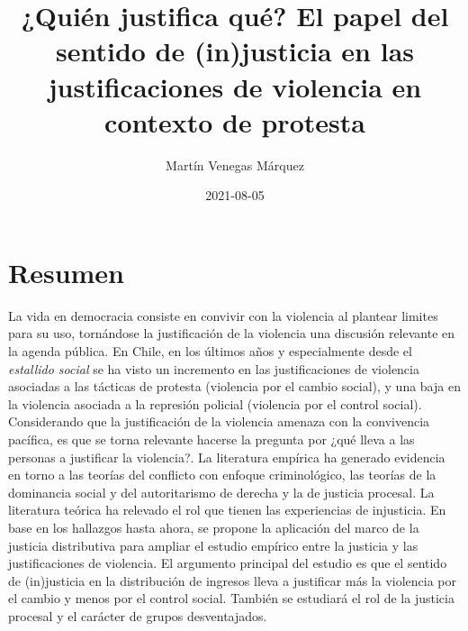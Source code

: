 \documentclass[12pt,twoside]{templates/facsothesis}
\title{¿Quién justifica qué? El papel del sentido de (in)justicia en las justificaciones de violencia en contexto de protesta}
\author{Martín Venegas Márquez}
\date{2021-08-05}
\begin{document}

  \maketitle

\frontmatter %
\pagestyle{empty} %



  \setcounter{tocdepth}{1}
  \setlength{\parskip}{0pt}
  \tableofcontents

\setlength\parskip{1em plus 0.1em minus 0.2em}

  \listoftables

  \listoffigures



\mainmatter %
\pagestyle{fancyplain} %

\hypertarget{resumen}{%
\chapter*{Resumen}\label{resumen}}

La vida en democracia consiste en convivir con la violencia al plantear limites para su uso, tornándose la justificación de la violencia una discusión relevante en la agenda pública. En Chile, en los últimos años y especialmente desde el \emph{estallido social} se ha visto un incremento en las justificaciones de violencia asociadas a las tácticas de protesta (violencia por el cambio social), y una baja en la violencia asociada a la represión policial (violencia por el control social). Considerando que la justificación de la violencia amenaza con la convivencia pacífica, es que se torna relevante hacerse la pregunta por ¿qué lleva a las personas a justificar la violencia?. La literatura empírica ha generado evidencia en torno a las teorías del conflicto con enfoque criminológico, las teorías de la dominancia social y del autoritarismo de derecha y la de justicia procesal. La literatura teórica ha relevado el rol que tienen las experiencias de injusticia. En base en los hallazgos hasta ahora, se propone la aplicación del marco de la justicia distributiva para ampliar el estudio empírico entre la justicia y las justificaciones de violencia. El argumento principal del estudio es que el sentido de (in)justicia en la distribución de ingresos lleva a justificar más la violencia por el cambio y menos por el control social. También se estudiará el rol de la justicia procesal y el carácter de grupos desventajados.
\end{document}
